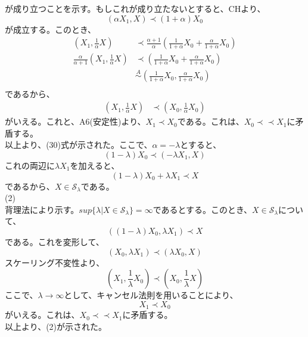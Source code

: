 \documentclass[a4paper,11pt]{jsarticle}
\begin{document}
が成り立つことを示す。もしこれが成り立たないとすると、CHより、
\begin{equation}
    (\alpha X_1,X) \prec (1+\alpha)X_0
\end{equation}
が成立する。このとき、
\begin{align}
    (X_1,\frac{1}{\alpha}X) &\prec \frac{\alpha+1}{\alpha}(\frac{1}{1+\alpha}X_0+\frac{\alpha}{1+\alpha}X_0)\\
    \frac{\alpha}{\alpha+1}(X_1,\frac{1}{\alpha}X) &\prec (\frac{1}{1+\alpha}X_0+\frac{\alpha}{1+\alpha}X_0)\\
    &\overset{A}{\sim} (\frac{1}{1+\alpha}X_0,\frac{\alpha}{1+\alpha}X_0)\\
\end{align}
であるから、
\begin{align}
    (X_1,\frac{1}{\alpha}X) &\prec (X_0,\frac{1}{\alpha}X_0)
\end{align}
がいえる。これと、A6(安定性)より、$X_1 \prec X_0$である。これは、$X_0 \prec \prec X_1$に矛盾する。\\
以上より、(30)式が示された。ここで、$\alpha = -\lambda$とすると、
\begin{equation}
    (1-\lambda)X_0 \prec (-\lambda X_1,X)
\end{equation}
これの両辺に$\lambda X_1$を加えると、
\begin{equation}
    (1-\lambda)X_0 + \lambda X_1 \prec X
\end{equation}
であるから、$X \in \mathcal{S}_{\lambda}$である。\\
(2)\\
背理法により示す。$sup\{\lambda|X \in \mathcal{S}_{\lambda}\}=\infty$であるとする。このとき、$X\in \mathcal{S}_{\lambda}$について、
\begin{equation}
    ((1-\lambda)X_0,\lambda X_1) \prec X
\end{equation}
である。これを変形して、
\begin{equation}
    (X_0,\lambda X_1) \prec (\lambda X_0,X)
\end{equation}
スケーリング不変性より、
\begin{equation}
    (X_1,\frac{1}{\lambda}X_0) \prec (X_0,\frac{1}{\lambda}X)
\end{equation}  
ここで、$\lambda \rightarrow \infty$として、キャンセル法則を用いることにより、
\begin{equation}
    X_1 \prec X_0
\end{equation}
がいえる。これは、$X_0 \prec \prec X_1$に矛盾する。\\
以上より、(2)が示された。\hfill\qedsymbol\\
\end{document}
